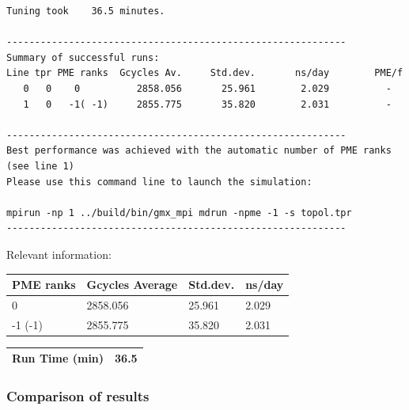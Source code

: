 \begin{lstlisting}[frame=single]
Tuning took    36.5 minutes.

------------------------------------------------------------
Summary of successful runs:
Line tpr PME ranks  Gcycles Av.     Std.dev.       ns/day        PME/f
   0   0    0          2858.056       25.961        2.029          -  
   1   0   -1( -1)     2855.775       35.820        2.031          -  

------------------------------------------------------------
Best performance was achieved with the automatic number of PME ranks (see line 1)
Please use this command line to launch the simulation:

mpirun -np 1 ../build/bin/gmx_mpi mdrun -npme -1 -s topol.tpr  
------------------------------------------------------------

\end{lstlisting}


Relevant information:
\begin{center}
    \begin{tabular}{|p{3.5cm}|p{3.5cm}|p{3.5cm}|p{3.5cm}|} \hline
         PME ranks & Gcycles Average & Std.dev. & ns/day \\ \hline
         0 & 2858.056  & 25.961  & 2.029  \\ \hline
         -1 (-1) & 2855.775 & 35.820 & 2.031 \\ \hline
    \end{tabular}
     \begin{tabular}{|p{3.5cm}|p{11.4cm}|} \hline
         Run Time (min) & 36.5 \\ \hline
    \end{tabular}
\end{center}

\subsubsection{Comparison of results}

